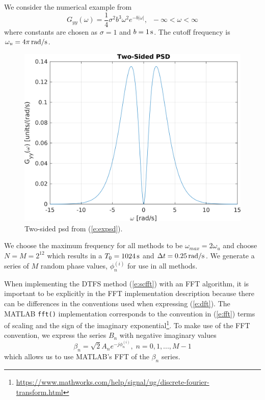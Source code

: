 \documentclass[techreport, article]{npsreport2018}
\begin{document}
We consider the numerical example from \cite{shinozuka91simulation}
\begin{equation}
  G_{yy}(\omega) = \frac{1}{4} \sigma^2 b^3 \omega^2 e^{-b|\omega|}, \; \; -\infty < \omega < \infty
  \label{e:expsd}
\end{equation}
where constants are chosen as $\sigma=1$ and $b=\unit[1]{s}$. The cutoff frequency is  $\omega_u = \unit[4 \pi]{rad/s} $.
\begin{figure}[hbt!]
  \centering
  \includegraphics[width=\FigWidth\textwidth]{images/two_sided.png}
  \caption{Two-sided \ac{psd} from (\ref{e:expsd}).}
  \label{f:psd}
\end{figure}
We choose the maximum frequency for all methods to be $\omega_{max}=2\omega_u$ and choose $N=M=2^{12}$ which results in a $T_0 = \unit[1024]{s}$ and $\Delta t = \unit[0.25]{rad/s}$.  We generate a series of $M$ random phase values, $\phi^{(i)}_n$ for use in all methods.

When implementing the DTFS method (\ref{e:scfft}) with an FFT algorithm, it is important to be explicitly in the FFT implementation description because there can be differences in the conventions used when expressing (\ref{e:dft}).  The MATLAB \texttt{fft()} implementation corresponds to the convention in (\ref{e:fft}) terms of scaling and the sign of the imaginary exponential\footnote{\url{https://www.mathworks.com/help/signal/ug/discrete-fourier-transform.html}}.  To make use of the FFT convention, we express the series $B_n$ with negative imaginary values
\begin{equation}
  \beta_n = \sqrt{2} A_n e^{-j\phi^{(i)}_n}, \; n=0,1,...,M-1
\end{equation}
which allows us to use MATLAB's FFT of the $\beta_n$ series.
\end{document}
